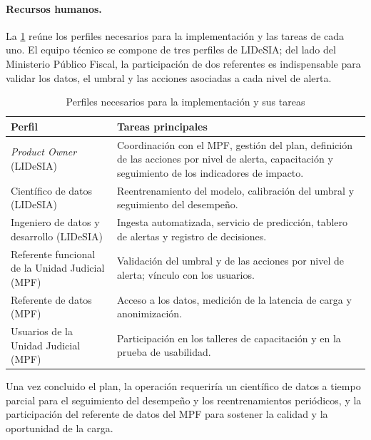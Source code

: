 \paragraph{Recursos humanos.} La \cref{tab:impl-equipo} reúne los perfiles necesarios
para la implementación y las tareas de cada uno. El equipo técnico se compone de tres
perfiles de LIDeSIA; del lado del Ministerio Público Fiscal, la participación de dos
referentes es indispensable para validar los datos, el umbral y las acciones asociadas a
cada nivel de alerta.

\begin{table}[htbp]
\centering
\caption{Perfiles necesarios para la implementación y sus tareas}
\label{tab:impl-equipo}
\begin{tabularx}{\linewidth}{@{}>{\raggedright\arraybackslash}p{}
                                >{\raggedright\arraybackslash}X@{}}
\toprule
\textbf{Perfil} & \textbf{Tareas principales} \\
\midrule
\textit{Product Owner} (LIDeSIA)
  & Coordinación con el MPF, gestión del plan, definición de las acciones por nivel de
    alerta, capacitación y seguimiento de los indicadores de impacto. \\
Científico de datos (LIDeSIA)
  & Reentrenamiento del modelo, calibración del umbral y seguimiento del desempeño. \\
Ingeniero de datos y desarrollo (LIDeSIA)
  & Ingesta automatizada, servicio de predicción, tablero de alertas y registro de
    decisiones. \\
\midrule
Referente funcional de la Unidad Judicial (MPF)
  & Validación del umbral y de las acciones por nivel de alerta; vínculo con los
    usuarios. \\
Referente de datos (MPF)
  & Acceso a los datos, medición de la latencia de carga y anonimización. \\
Usuarios de la Unidad Judicial (MPF)
  & Participación en los talleres de capacitación y en la prueba de usabilidad. \\
\bottomrule
\end{tabularx}
\end{table}

Una vez concluido el plan, la operación requeriría un científico de datos a tiempo
parcial para el seguimiento del desempeño y los reentrenamientos periódicos, y la
participación del referente de datos del MPF para sostener la calidad y la oportunidad de
la carga.

